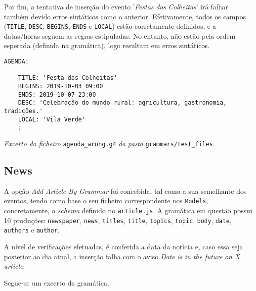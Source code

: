 Por fim, a tentativa de inserção do evento '\textit{Festas das Colheitas}' irá falhar também devido erros sintáticos como o anterior.
Efetivamente, todos os campos (\texttt{TITLE}, \texttt{DESC}, \texttt{BEGINS}, \texttt{ENDS} e \texttt{LOCAL}) estão corretamente definidos, e a datas/horas seguem as regras estipuladas. No entanto, não estão pela ordem esperada (definida na gramática), logo resultam em erros sintáticos.

\begin{framed}
\begin{lstlisting}[language=ANTLR]
    AGENDA:

    TITLE: 'Festa das Colheitas'
    BEGINS: 2019-10-03 09:00
    ENDS: 2019-10-07 23:00
    DESC: 'Celebração do mundo rural: agricultura, gastronomia, tradições.'
    LOCAL: 'Vila Verde'
    ;
\end{lstlisting}
\end{framed}
\begin{center}
\textit{Excerto do ficheiro} \texttt{agenda\_wrong.g4} \textit{da pasta} \texttt{grammars/test\_files}.
\end{center}

\subsection{News}
A opção \textit{Add Article By Grammar} foi concebida, tal como a sua semelhante dos eventos, tendo como base o seu ficheiro correspondente nos \texttt{Models}, concretamente, o \textit{schema} definido no \texttt{article.js}. A gramática em questão possui 10 produções: \texttt{newspaper}, \texttt{news}, \texttt{titles}, \texttt{title}, \texttt{topics}, \texttt{topic}, \texttt{body}, \texttt{date}, \texttt{authors} e \texttt{author}.

A nível de verificações efetuadas, é conferida a data da notícia e, caso essa seja posterior ao dia atual, a inserção falha com o aviso \textit{Date is in the future on X article}. 

Segue-se um excerto da gramática.

